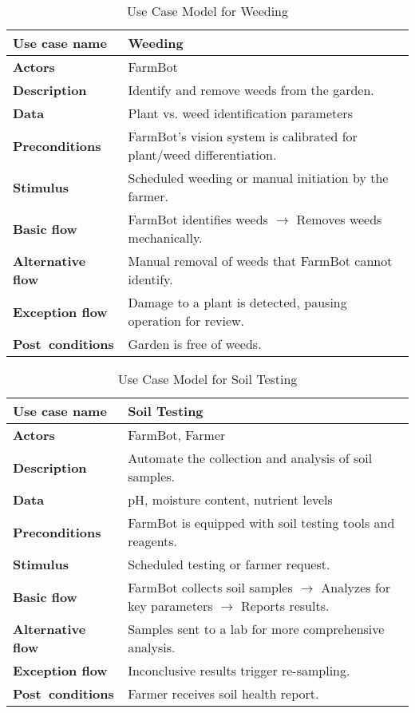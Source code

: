 \begin{table}[H]
\centering
\begin{tabular}{|p{4cm}|p{9cm}|}
\hline
\textbf{Use case name}    & Weeding \\
\hline
\textbf{Actors}           & FarmBot \\
\hline
\textbf{Description}      & Identify and remove weeds from the garden. \\
\hline
\textbf{Data}             & Plant vs. weed identification parameters \\
\hline
\textbf{Preconditions}    & FarmBot's vision system is calibrated for plant/weed differentiation. \\
\hline
\textbf{Stimulus}         & Scheduled weeding or manual initiation by the farmer. \\
\hline
\textbf{Basic flow}       & FarmBot identifies weeds $\rightarrow$ Removes weeds mechanically. \\
\hline
\textbf{Alternative flow} & Manual removal of weeds that FarmBot cannot identify. \\
\hline
\textbf{Exception flow}   & Damage to a plant is detected, pausing operation for review. \\
\hline
\textbf{Post conditions}  & Garden is free of weeds. \\
\hline
\end{tabular}
\caption{Use Case Model for Weeding}
\end{table}

\begin{table}[H]
\centering
\begin{tabular}{|p{4cm}|p{9cm}|}
\hline
\textbf{Use case name}    & Soil Testing \\
\hline
\textbf{Actors}           & FarmBot, Farmer \\
\hline
\textbf{Description}      & Automate the collection and analysis of soil samples. \\
\hline
\textbf{Data}             & pH, moisture content, nutrient levels \\
\hline
\textbf{Preconditions}    & FarmBot is equipped with soil testing tools and reagents. \\
\hline
\textbf{Stimulus}         & Scheduled testing or farmer request. \\
\hline
\textbf{Basic flow}       & FarmBot collects soil samples $\rightarrow$ Analyzes for key parameters $\rightarrow$ Reports results. \\
\hline
\textbf{Alternative flow} & Samples sent to a lab for more comprehensive analysis. \\
\hline
\textbf{Exception flow}   & Inconclusive results trigger re-sampling. \\
\hline
\textbf{Post conditions}  & Farmer receives soil health report. \\
\hline
\end{tabular}
\caption{Use Case Model for Soil Testing}
\end{table}

